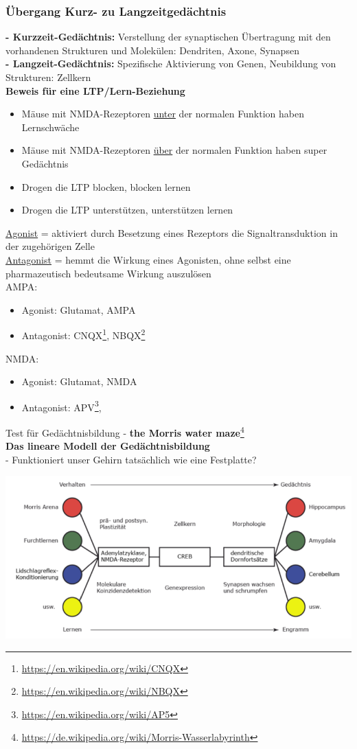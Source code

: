 \subsubsection{Übergang Kurz- zu Langzeitgedächtnis}
\textbf{ - Kurzzeit-Gedächtnis:} Verstellung der synaptischen Übertragung mit den vorhandenen Strukturen und Molekülen: Dendriten, Axone, Synapsen\\
\textbf{ - Langzeit-Gedächtnis:} Spezifische Aktivierung von Genen, Neubildung von Strukturen: Zellkern\\

\textbf{Beweis für eine LTP/Lern-Beziehung}
\begin{itemize}
	\item Mäuse mit NMDA-Rezeptoren \underline{unter} der normalen Funktion haben Lernschwäche
	\item Mäuse mit NMDA-Rezeptoren \underline{über} der normalen Funktion haben super Gedächtnis
	\item Drogen die LTP blocken, blocken lernen
	\item Drogen die LTP unterstützen, unterstützen lernen
\end{itemize}

\underline{Agonist} = aktiviert durch Besetzung eines Rezeptors die Signaltransduktion in der zugehörigen Zelle\\
\underline{Antagonist} = hemmt die Wirkung eines Agonisten, ohne selbst eine pharmazeutisch bedeutsame Wirkung auszulösen\\

AMPA:
\begin{itemize}
	\item Agonist: Glutamat, AMPA
	\item Antagonist: CNQX\footnote{\url{https://en.wikipedia.org/wiki/CNQX}}, NBQX\footnote{\url{https://en.wikipedia.org/wiki/NBQX}}
\end{itemize}

NMDA:
\begin{itemize}
	\item Agonist: Glutamat, NMDA
	\item Antagonist: APV\footnote{\url{https://en.wikipedia.org/wiki/AP5}}, 
\end{itemize}

Test für Gedächtnisbildung - \textbf{the Morris water maze}\footnote{\url{https://de.wikipedia.org/wiki/Morris-Wasserlabyrinth}}\\

\textbf{Das lineare Modell der Gedächtnisbildung}\\
 - Funktioniert unser Gehirn tatsächlich wie eine Festplatte?

\includegraphics[width=1\textwidth]{lectures/160622/pix/memory_genesis.png}